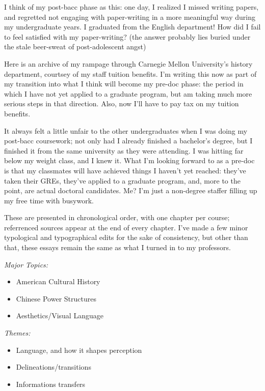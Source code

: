 I think of my post-bacc phase as this: one day, I realized I missed writing
papers, and regretted not engaging with paper-writing in a more meaningful way
during my undergraduate years. I graduated from the English department! How did
I fail to feel satisfied with my paper-writing? (the answer probably lies buried
under the stale beer-sweat of post-adolescent angst)

Here is an archive of my rampage through Carnegie Mellon University's history
department, courtsey of my staff tuition benefits. I'm writing this now as part
of my transition into what I think will become my pre-doc phase: the period in
which I have not yet applied to a graduate program, but am taking much more
serious steps in that direction. Also, now I'll have to pay tax on my tuition
benefits.

It always felt a little unfair to the other undergraduates when I was doing my
post-bacc coursework; not only had I already finished a bachelor's degree, but I
finished it from the same university as they were attending. I was hitting far
below my weight class, and I knew it. What I'm looking forward to as a pre-doc
is that my classmates will have achieved things I haven't yet reached: they've
taken their GREs, they've applied to a graduate program, and, more to the point,
are actual doctoral candidates. Me? I'm just a non-degree staffer filling up my
free time with busywork.

These are presented in chronological order, with one chapter per course;
referrenced sources appear at the end of every chapter. I've made a few minor
typological and typographical edits for the sake of consistency, but other than
that, these essays remain the same as what I turned in to my professors.

\textit{Major Topics:}
    \begin{itemize}
    \item American Cultural History
    \item Chinese Power Structures
    \item Aesthetics/Visual Language
    \end{itemize}

\textit{Themes:}
    \begin{itemize}
    \item Language, and how it shapes perception
    \item Delineations/transitions
    \item Informations transfers
    \end{itemize}
